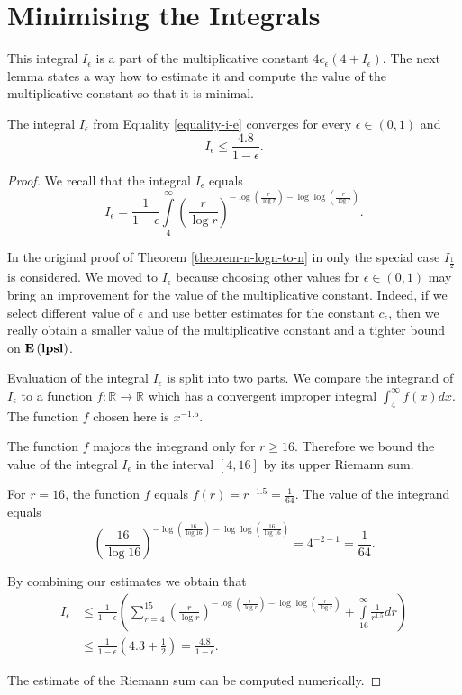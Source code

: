 \section{Minimising the Integrals}
This integral $I_\epsilon$ is a part of the multiplicative constant $4c_\epsilon(4 + I_\epsilon)$. The next lemma states a way how to estimate it and compute the value of the multiplicative constant so that it is minimal.

\label{section-integral-estimate}
\begin{lemma}
\label{lemma-convergent-I-e}
The integral $I_\epsilon$ from Equality \ref{equality-i-e} converges for every $\epsilon \in (0, 1)$ and
\[
I_\epsilon \leq \frac{4.8}{1 - \epsilon} \text{.}
\]
\end{lemma}
\begin{proof}
We recall that the integral $I_\epsilon$ equals
\[
I_{\epsilon} = \frac{1}{1 - \epsilon} \displaystyle\int\limits_4^\infty \left(\frac{r}{\log r}\right)^{-\log \left(\frac{r}{\log r}\right) - \log \log \left(\frac{r}{\log r}\right)} \text{.}
\]

In the original proof of Theorem \ref{theorem-n-logn-to-n} in \cite{DBLP:journals/jacm/AlonDMPT99} only the special case $I_{\frac{1}{2}}$ is considered. We moved to $I_\epsilon$ because choosing other values for $\epsilon \in (0, 1)$ may bring an improvement for the value of the multiplicative constant. Indeed, if we select different value of $\epsilon$ and use better estimates for the constant $c_\epsilon$, then we really obtain a smaller value of the multiplicative constant and a tighter bound on $\mathbf{E}\left(\mathbf{lpsl}\right)$.

Evaluation of the integral $I_\epsilon$ is split into two parts. We compare the integrand of $I_\epsilon$ to a function $f: \mathbb{R} \rightarrow \mathbb{R}$ which has a convergent improper integral $\int_{4}^{\infty} f(x) dx$. The function $f$ chosen here is $x ^ {-1.5}$. 

The function $f$ majors the integrand only for $r \geq 16$. Therefore we bound the value of the integral $I_\epsilon$ in the interval $[4, 16]$ by its upper Riemann sum.

For $r = 16$, the function $f$ equals $f(r) = r ^ {-1.5} = \frac{1}{64}$.
The value of the integrand equals
\[
	\left(\frac{16}{\log 16}\right)^{-\log \left(\frac{16}{\log 16}\right) - \log \log \left(\frac{16}{\log 16}\right)} = 4^{-2 - 1} = \frac{1}{64} \text{.}
\]

By combining our estimates we obtain that
\[
\begin{split}
I_{\epsilon} 
	& \leq \frac{1}{1 - \epsilon} \left( \displaystyle \sum_{r = 4}^{15} \left(\frac{r}{\log r}\right)^{-\log \left(\frac{r}{\log r}\right) - \log \log \left(\frac{r}{\log r}\right)} + \int\limits_{16}^\infty \frac{1}{r^{1.5}} dr \right) \\
	& \leq \frac{1}{1 - \epsilon} \left(4.3 + \frac{1}{2}\right) = \frac{4.8}{1-\epsilon} \text{.}
\end{split}
\]

The estimate of the Riemann sum can be computed numerically.
\end{proof}

